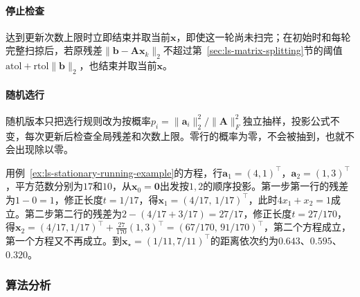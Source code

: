 \paragraph{停止检查}
达到更新次数上限时立即结束并取当前$\bm x$，即使这一轮尚未扫完；在初始时和每轮完整扫掠后，若原残差$\lVert\bm b-\bm A\bm x_k\rVert_2$不超过第~\ref{sec:ls-matrix-splitting}节的阈值$\mathrm{atol}+\mathrm{rtol}\lVert\bm b\rVert_2$，也结束并取当前$\bm x$。

\paragraph{随机选行}
随机版本只把选行规则改为按概率$p_i=\lVert\bm a_i\rVert_2^2/\lVert\bm A\rVert_F^2$独立抽样，投影公式不变，每次更新后检查全局残差和次数上限。零行的概率为零，不会被抽到，也就不会出现除以零。

\begin{example}[Kaczmarz算法的前两步]
\label{ex:ls-kaczmarz-two-steps}
用例~\ref{ex:ls-stationary-running-example}的方程，行$\bm a_1=(4,1)^\top$，$\bm a_2=(1,3)^\top$，平方范数分别为$17$和$10$，从$\bm x_0=\bm 0$出发按$1,2$的顺序投影。第一步第一行的残差为$1-0=1$，修正长度$t=1/17$，得$\bm x_1=(4/17,\,1/17)^\top$，此时$4x_1+x_2=1$成立。第二步第二行的残差为$2-(4/17+3/17)=27/17$，修正长度$t=27/170$，得$\bm x_2=(4/17,1/17)^\top+\tfrac{27}{170}(1,3)^\top=(67/170,\,91/170)^\top$，第二个方程成立，第一个方程又不再成立。到$\bm x_\star=(1/11,7/11)^\top$的距离依次约为$0.643$、$0.595$、$0.320$。
\end{example}

\subsubsection{算法分析}


